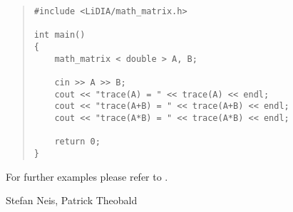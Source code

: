 
\EXAMPLES

\begin{quote}
\begin{verbatim}
#include <LiDIA/math_matrix.h>

int main()
{
    math_matrix < double > A, B;

    cin >> A >> B;
    cout << "trace(A) = " << trace(A) << endl;
    cout << "trace(A+B) = " << trace(A+B) << endl;
    cout << "trace(A*B) = " << trace(A*B) << endl;

    return 0;
}
\end{verbatim}
\end{quote}

For further examples please refer to .


\AUTHOR

Stefan Neis, Patrick Theobald
